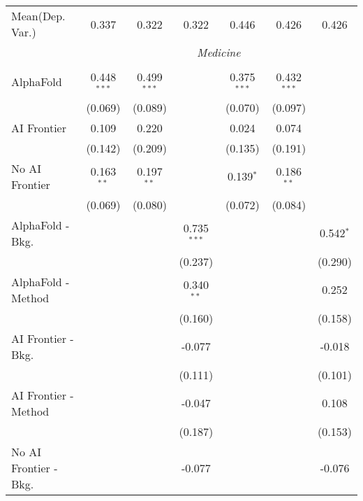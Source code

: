 \begin{tabular}{lcccccc}
Mean(Dep. Var.) & 0.337 & 0.322 & 0.322 & 0.446 & 0.426 & 0.426 \\
 & \multicolumn{6}{c}{\textit{Medicine}} \\ \\
   AlphaFold               & 0.448$^{***}$ & 0.499$^{***}$ &               & 0.375$^{***}$ & 0.432$^{***}$ &   \\   
                           & (0.069)       & (0.089)       &               & (0.070)       & (0.097)       &   \\   
   AI Frontier             & 0.109         & 0.220         &               & 0.024         & 0.074         &   \\   
                           & (0.142)       & (0.209)       &               & (0.135)       & (0.191)       &   \\   
   No AI Frontier          & 0.163$^{**}$  & 0.197$^{**}$  &               & 0.139$^{*}$   & 0.186$^{**}$  &   \\   
                           & (0.069)       & (0.080)       &               & (0.072)       & (0.084)       &   \\   
   AlphaFold - Bkg.        &               &               & 0.735$^{***}$ &               &               & 0.542$^{*}$\\   
                           &               &               & (0.237)       &               &               & (0.290)\\   
   AlphaFold - Method      &               &               & 0.340$^{**}$  &               &               & 0.252\\   
                           &               &               & (0.160)       &               &               & (0.158)\\   
   AI Frontier - Bkg.      &               &               & -0.077        &               &               & -0.018\\   
                           &               &               & (0.111)       &               &               & (0.101)\\   
   AI Frontier - Method    &               &               & -0.047        &               &               & 0.108\\   
                           &               &               & (0.187)       &               &               & (0.153)\\   
   No AI Frontier - Bkg.   &               &               & -0.077        &               &               & -0.076\\   

\end{tabular}
